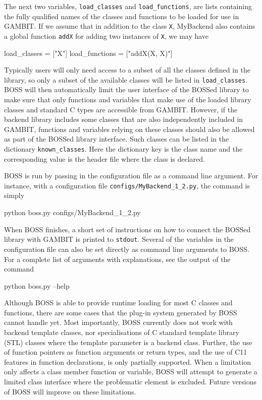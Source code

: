 \documentclass[pdftex,twocolumn,epjc3_preprint,runningheads]{svjour3}
\renewcommand{\_}{\discretionary{\underscore}{}{\underscore}}
\newcommand\cpp[1]{{\lstinline!#1!}}  %
\newcommand\term[1]{{\lstset{style=terminal}\lstinline!#1!\lstset{style=cpp}}}
\newcommand\py[1]{{\lstset{style=python}\lstinline!#1!\lstset{style=cpp}}}
\newcommand{\gambit}{\textsf{GAMBIT}\xspace}
\newcommand{\BOSS}{\textsf{BOSS}\xspace}
\newcommand{\GB}{\gambit}
\newcommand\xx{\raisebox{0.2ex}{\smaller ++}\xspace}
\newcommand\Cpp{\textsf{C\xx}\xspace}
\newcommand\Cppeleven{\textsf{C\raisebox{0.2ex}{\smaller ++}11}\xspace}
\begin{document}
The next two variables, \py{load_classes} and \py{load_functions}, are lists containing the fully qualified names of the classes and functions to be loaded for use in \GB. If we assume that in addition to the class \cpp{X}, \textsf{MyBackend} also contains a global function \cpp{addX} for adding two instances of \mbox{\cpp{X},} we may have
\begin{lstpy}
load_classes = ["X"]
load_functions = ["addX(X, X)"]
\end{lstpy}

Typically users will only need access to a subset of all the classes defined in the library, so only a subset of the available classes will be listed in \py{load_classes}. \BOSS will then automatically limit the user interface of the BOSSed library to make sure that only functions and variables that make use of the loaded library classes and standard \Cpp types are accessible from \GB. However, if the backend library includes some classes that are also independently included in \GB, functions and variables relying on these classes should also be allowed as part of the BOSSed library interface. Such classes can be listed in the dictionary \py{known_classes}. Here the dictionary key is the class name and the corresponding value is the header file where the class is declared.

\BOSS is run by passing in the configuration file as a command line argument. For instance, with a configuration file \term{configs/MyBackend_1_2.py}, the command is simply
\begin{lstterm}
python boss.py configs/MyBackend_1_2.py
\end{lstterm}
When \BOSS finishes, a short set of instructions on how to connect the BOSSed library with \GB is printed to \term{stdout}. Several of the variables in the configuration file can also be set directly as command line arguments to \BOSS. For a complete list of arguments with explanations, see the output of the command
\begin{lstterm}
python boss.py --help
\end{lstterm}

Although \BOSS is able to provide runtime loading for most \Cpp classes and functions, there are some cases that the plug-in system generated by \BOSS cannot handle yet. Most importantly, \BOSS currently does not work with backend template classes, nor specialisations of \Cpp standard template library (STL) classes where the template parameter is a backend class. Further, the use of function pointers as function arguments or return types, and the use of \Cppeleven features in function declarations, is only partially supported. When a limitation only affects a class member function or variable, \BOSS will attempt to generate a limited class interface where the problematic element is excluded.  Future versions of \BOSS will improve on these limitations.
\end{document}
